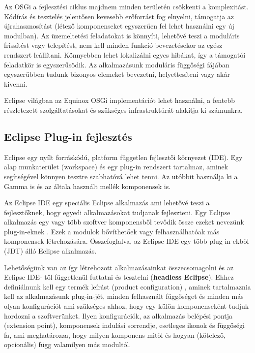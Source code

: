 Az OSGi a fejlesztési ciklus majdnem minden területén csökkenti a komplexitást. Kódírás és tesztelés jelentősen kevesebb erőforrást fog elnyelni, támogatja az újrahasznosítást (létező komponenseket egyszerűen fel lehet használni egy új modulban). Az üzemeltetési feladatokat is könnyíti, lehetővé teszi a moduláris frissítést vagy telepítést, nem kell minden funkció bevezetésekor az egész rendszert leállítani. Könnyebben lehet lokalizálni egyes hibákat, így a támogatói feladatkör is egyszerűsödik. Az alkalmazásunk moduláris függőségi fájában egyszerűbben tudunk bizonyos elemeket bevezetni, helyettesíteni vagy akár kivenni.

Eclipse világban az Equinox \cite{committers} OSGi implementációt lehet használni, a fentebb részletezett szolgáltatásokat és szükséges infrastruktúrát alakítja ki számunkra.

\subsection{Eclipse Plug-in fejlesztés}

Eclipse egy nyílt forráskódú, platform független fejlesztői környezet (IDE). Egy alap munkaterület (workspace) és egy plug-in rendszert tartalmaz, aminek segítségével könnyen tesztre szabhatóvá lehet tenni. Az utóbbit használja ki a Gamma is és az általa használt mellék komponensek is. 

Az Eclipse IDE egy speciális Eclipse alkalmazás ami lehetővé teszi a fejlesztőknek, hogy egyedi alkalmazásokat tudjanak fejleszteni. Egy Eclipse alkalmazás egy vagy több szoftver komponensből tevődik össze ezeket nevezünk plug-in-eknek \cite{plugin}. Ezek a modulok bővíthetőek vagy felhasználhatóak más komponensek létrehozására. Összefoglalva, az Eclipse IDE egy több plug-in-ekből (JDT) álló Eclipse alkalmazás.

Lehetőségünk van az így létrehozott alkalmazásainkat összecsomagolni és az Eclipse IDE- től függetlenül futtatni és tesztelni (\textbf{headless Eclipse}).
Ehhez definiálnunk kell egy termék leírást (product configuration) \cite{product}, aminek tartalmaznia kell az alkalmazásunk plug-in-jét, minden felhasznált függőséget és minden más olyan konfigurációt ami szükséges ahhoz, hogy egy külön komponenseként tudjuk hordozni a szoftverünket. Ilyen konfigurációk, az alkalmazás belépési pontja (extension point), komponensek indulási sorrendje, esetleges ikonok és függőségi fa, ami meghatározza, hogy milyen komponens mitől és hogyan (kötelező, opcionális) függ valamilyen más modultól.

